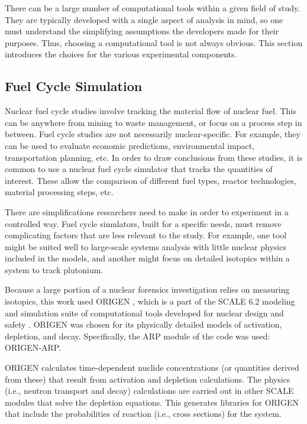 There can be a large number of computational tools within a given field of
study.  They are typically developed with a single aspect of analysis in mind,
so one must understand the simplifying assumptions the developers made for
their purposes. Thus, choosing a computational tool is not always obvious. This
section introduces the choices for the various experimental components.

\subsection{Fuel Cycle Simulation}

Nuclear fuel cycle studies involve tracking the material flow of nuclear fuel.
This can be anywhere from mining to waste management, or focus on a process
step in between. Fuel cycle studies are not necessarily nuclear-specific. For
example, they can be used to evaluate economic predictions, environmental
impact, transportation planning, etc.  In order to draw conclusions from these
studies, it is common to use a nuclear fuel cycle simulator that tracks the
quantities of interest. These allow the comparison of different fuel types,
reactor technologies, material processing steps, etc. 

There are simplifications researchers need to make in order to experiment in a
controlled way. Fuel cycle simulators, built for a specific needs, must remove
complicating factors that are less relevant to the study.  For example, one
tool might be suited well to large-scale systems analysis with little nuclear
physics included in the models, and another might focus on detailed isotopics
within a system to track plutonium.

Because a large portion of a nuclear forensics investigation relies on
measuring isotopics, this work used \gls{ORIGEN} \cite{origen}, which is a part
of the \gls{SCALE} 6.2 modeling and simulation suite of computational tools
developed for nuclear design and safety \cite{scale}. \gls{ORIGEN} was chosen
for its physically detailed models of activation, depletion, and decay.
Specifically, the ARP module of the code was used: \gls{ORIGEN-ARP}.

\gls{ORIGEN} calculates time-dependent nuclide concentrations (or quantities
derived from these) that result from activation and depletion calculations. The
physics (i.e., neutron transport and decay) calculations are carried out in
other \gls{SCALE} modules that solve the depletion equations.  This generates
libraries for \gls{ORIGEN} that include the probabilities of reaction (i.e.,
cross sections) for the system.

